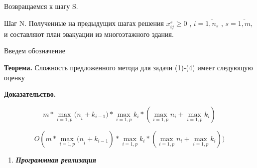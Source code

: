 Возвращаемся к шагу S.

Шаг N. Полученные на предыдущих шагах решения \(x_{ij}^{s} \geq 0\) ,
\(i = \overline{1,n_{s}}\) , \(s = \overline{1,m}\), и составляют план
эвакуации из многоэтажного здания.

Введем обозначение


{\bfseries Теорема.} Сложность предложенного метода для задачи (1)-(4)
имеет следующую оценку


{\bfseries Доказательство.}

\[m \ast \max_{i = 1,p}{(n}_{i} + k_{i - 1}) \ast \max_{i = 1,p}k_{i} \ast \left( \max_{i = 1,p}n_{i} + \max_{i = 1,p}k_{i} \right)\]

\[O(m \ast \max_{i = 1,p}{(n}_{i} + k_{i - 1}) \ast \max_{i = 1,p}k_{i} \ast (\max_{i = 1,p}n_{i} + \max_{i = 1,p}k_{i}))\]

\begin{enumerate}
\def\labelenumi{\arabic{enumi}.}
\setcounter{enumi}{2}
\item
  \emph{{\bfseries Программная реализация}}
\end{enumerate}


